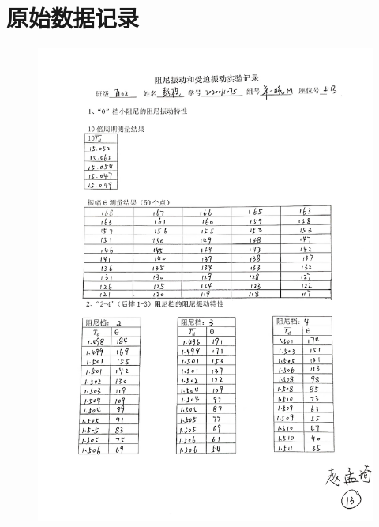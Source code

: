 \documentclass[UTF8]{ctexart}
\begin{document}
\section{原始数据记录}
\begin{figure}[H]
    \centering
    \includegraphics[scale=0.14]{原始数据1.jpg}
\end{figure}
\end{document}
